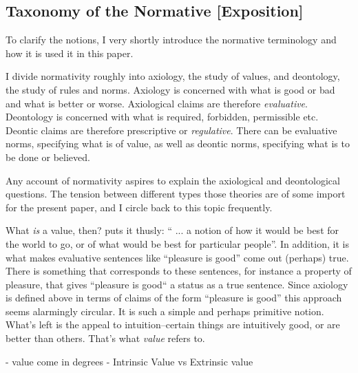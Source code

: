\documentclass[12pt,numbers=noenddot]{scrartcl}
\begin{document}
\subsection{ Taxonomy of the Normative [Exposition]}

To clarify the notions, I very shortly introduce the normative terminology and how it is used it in this paper.

I divide normativity roughly into axiology, the study of values, and deontology, the study of rules and norms. Axiology is concerned with what is good or bad and what is better or worse. Axiological claims are therefore \emph{evaluative}. Deontology is concerned with what is required, forbidden, permissible etc. Deontic claims are therefore prescriptive or \emph{regulative}. There can be evaluative norms, specifying what is of value, as well as deontic norms, specifying what is to be done or believed.

Any account of normativity aspires to explain the axiological and deontological questions. The tension between different types those theories are of some import for the present paper, and I circle back to this topic frequently.

What \emph{is} a value, then? \textcite[79]{scanlon1998} puts it thusly: “ ... a notion of how it would be best for the world to go, or of what would be best for particular people”. In addition, it is what makes evaluative sentences like “pleasure is good” come out (perhaps) true. There is something that corresponds to these sentences, for instance a property of pleasure, that gives “pleasure is good“ a status as a true sentence. Since axiology is defined above in terms of claims of the form “pleasure is good” this approach seems alarmingly circular. It is such a simple and perhaps primitive notion. What's left is the appeal to intuition–certain things are intuitively good, or are better than others. That's what \emph{value} refers to.

- value come in degrees
- Intrinsic Value vs Extrinsic value
\end{document}
